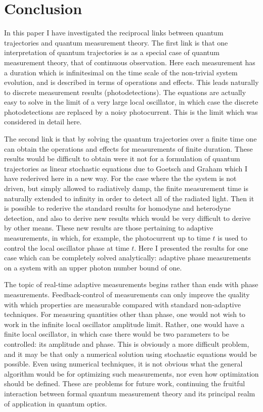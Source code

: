\section{Conclusion}

In this paper I have investigated the reciprocal links between quantum
trajectories and quantum measurement theory. The first link is that one
interpretation of quantum trajectories is as a special case of quantum
measurement theory, that of continuous observation. Here each measurement
has a duration which is infinitesimal on the time scale of the non-trivial system
evolution, and is described in terms of operations and effects.
This leads naturally to discrete measurement results (photodetections). The
equations are actually easy to solve in the limit of a very large local
oscillator, in which case the discrete photodetections are replaced by a noisy
photocurrent. This is the limit which was considered in detail here.

The second link is that by solving the quantum trajectories over a finite time
one can obtain the operations and effects for measurements of finite duration. These
results would be difficult to obtain were it not for a formulation of quantum
trajectories as linear stochastic \sch equations due to Goetsch and Graham which I
have rederived here in a new way. For the case where the the system is not driven, but 
simply allowed
to  radiatively damp, the finite measurement time is naturally extended to infinity in order to
detect all of the radiated light. Then it is possible to rederive the standard results for
homodyne and heterodyne detection, and also to derive new results which would
be very difficult to derive by other means. These new results are those
pertaining to adaptive measurements, in which, for example, the photocurrent up to
time $t$ is used to control the local oscillator phase at time $t$. Here I
presented the results for one case which can be completely solved analytically: adaptive phase
measurements on a system with an upper photon number bound of one.

The topic of real-time adaptive measurements begins rather than ends with phase
measurements. Feedback-control of measurements can only improve the quality with
which properties are measurable compared with standard non-adaptive techniques.
For measuring quantities other than phase, one would not wish to work in the
infinite local oscillator amplitude limit. Rather, one would have a finite local
oscillator, in which case there would be two parameters to be controlled: its
amplitude and phase. This is obviously a more difficult problem, and it may be
that only a numerical solution using stochastic \sch equations would be possible.
Even using numerical techniques, it is not obvious what the general algorithm
would be for optimizing such measurements, nor even how optimization should be
defined. These are problems for future work, continuing the fruitful interaction
between formal quantum measurement theory and its principal realm of application
in quantum optics.

